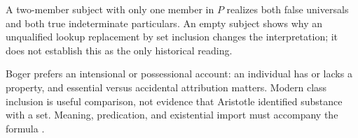 A two-member subject with only one member in \(P\) realizes both false
universals and both true indeterminate particulars. An empty subject shows
why an unqualified lookup replacement by set inclusion changes the
interpretation; it does not establish this as the only historical reading.

Boger prefers an intensional or possessional account: an individual has
or lacks a property, and essential versus accidental attribution matters.
Modern class inclusion is useful comparison, not evidence that Aristotle
identified substance with a set. Meaning, predication, and existential
import must accompany the formula \parencite[pp.~164--165]{Boger2004UnderlyingLogic}.
